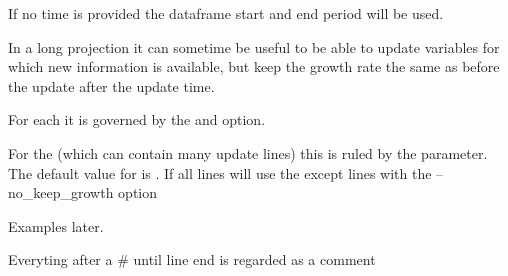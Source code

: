 \documentclass[letterpaper,10pt,english]{jupyterBook}
\begin{document}
\sphinxAtStartPar
If no time is provided the dataframe start and end period will be used.

\sphinxAtStartPar
{}

\sphinxAtStartPar
In a long projection it can sometime be useful to be able to update variables for which new information is available, but keep the growth rate the same as before the update  after the update time.

\sphinxAtStartPar
For each  it is governed
by the  and  option.

\sphinxAtStartPar
For the  (which can contain many update lines) this is ruled by the  parameter.
The default value for  is . If  all lines will use the 
except lines with the –no\_keep\_growth option

\sphinxAtStartPar
Examples later.

\sphinxAtStartPar
{}

\sphinxAtStartPar
Everyting after a \# until line end is regarded as a comment
\end{document}
